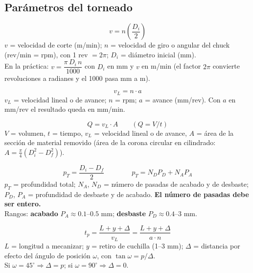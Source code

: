 \documentclass[12pt,a4paper]{article}
\begin{document}
\subsection{Parámetros del torneado}

\begin{formu}
	\[ v = n\left(\frac{D_i}{2}\right) \]
	$v$ = velocidad de corte (m/min); $n$ = velocidad de giro o angular del chuck
	(rev/min = rpm), con 1 rev $= 2\pi$; $D_i$ = diámetro inicial (mm).\\
	En la práctica: $v = \dfrac{\pi\, D_i\, n}{1000}$ con $D_i$ en mm y $v$ en
	m/min
	(el factor $2\pi$ convierte revoluciones a radianes y el 1000 pasa mm a m).
\end{formu}

\begin{formu}
	\[ v_L = n\cdot a \]
	$v_L$ = velocidad lineal o de avance; $n$ = rpm; $a$ = avance (mm/rev). Con
	$a$
	en mm/rev el resultado queda en mm/min.
\end{formu}

\begin{formu}
	\[ Q = v_L \cdot A \qquad (Q = V/t) \]
	$V$ = volumen, $t$ = tiempo, $v_L$ = velocidad lineal o de avance, $A$ = área
	de la sección de material removido (área de la corona circular en cilindrado:
	$A
		= \tfrac{\pi}{4}(D_i^2 - D_f^2)$).
\end{formu}

\begin{formu}
	\[ p_T = \frac{D_i - D_f}{2} \qquad\qquad p_T = N_D P_D + N_A P_A \]
	$p_T$ = profundidad total; $N_A$, $N_D$ = número de pasadas de acabado y de
	desbaste; $P_D$, $P_A$ = profundidad de desbaste y de acabado. \textbf{El
		número
		de pasadas debe ser entero.}\\
	Rangos: \textbf{acabado} $P_A \approx 0.1$--$0.5$ mm;
	\textbf{desbaste} $P_D \approx 0.4$--$3$ mm.\\
\end{formu}

\begin{formu}
	\[ t_p = \frac{L + y + \Delta}{v_L} = \frac{L + y + \Delta}{a\cdot n} \]
	$L$ = longitud a mecanizar; $y$ = retiro de cuchilla (1--3 mm); $\Delta$ =
	distancia por efecto del ángulo de posición $\omega$, con $\tan\omega =
		p/\Delta$.\\
	Si $\omega = 45^\circ \Rightarrow \Delta = p$; si $\omega = 90^\circ
		\Rightarrow \Delta = 0$.
\end{formu}
\end{document}

